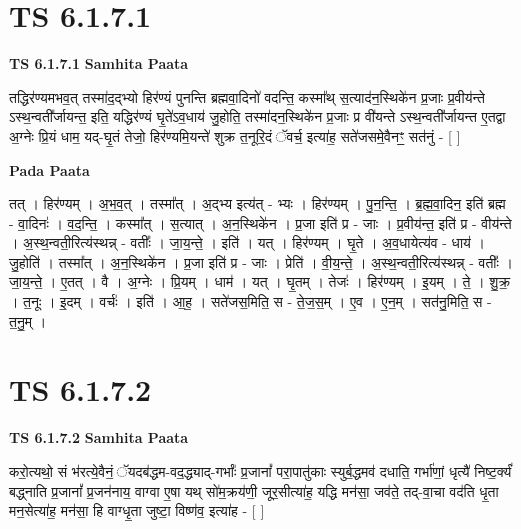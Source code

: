 \documentclass[17pt]{extarticle}
\begin{document}

\section{ TS 6.1.7.1 }

\textbf{TS 6.1.7.1 } \newline
\textbf{Samhita Paata} \newline

तद्धिर॑ण्यमभव॒त् तस्मा॑द॒द्भ्यो हिर॑ण्यं पुनन्ति ब्रह्मवा॒दिनो॑ वदन्ति॒ कस्मा᳚थ् स॒त्याद॑न॒स्थिके॑न प्र॒जाः प्र॒वीय॑न्ते ऽस्थ॒न्वती᳚र्जायन्त॒ इति॒ यद्धिर॑ण्यं घृ॒ते॑ऽव॒धाय॑ जु॒होति॒ तस्मा॑दन॒स्थिके॑न प्र॒जाः प्र वी॑यन्ते ऽस्थ॒न्वती᳚र्जायन्त ए॒तद्वा अ॒ग्नेः प्रि॒यं धाम॒ यद्-घृ॒तं तेजो॒ हिर॑ण्यमि॒यन्ते॑ शुक्र त॒नूरि॒दं ॅवर्च॒ इत्या॑ह॒ सते॑जसमे॒वैनꣳ॒॒ सत॑नुं - [  ] \newline

\textbf{Pada Paata} \newline

तत् । हिर॑ण्यम् । अ॒भ॒व॒त् । तस्मा᳚त् । अ॒द्भ्य इत्य॑त् - भ्यः । हिर॑ण्यम् । पु॒न॒न्ति॒ । ब्र॒ह्म॒वा॒दिन॒ इति॑ ब्रह्म - वा॒दिनः॑ । व॒द॒न्ति॒ । कस्मा᳚त् । स॒त्यात् । अ॒न॒स्थिके॑न । प्र॒जा इति॑ प्र - जाः । प्र॒वीय॑न्त॒ इति॑ प्र - वीय॑न्ते । अ॒स्थ॒न्वती॒रित्य॑स्थन्न् - वतीः᳚ । जा॒य॒न्ते॒ । इति॑ । यत् । हिर॑ण्यम् । घृ॒ते । अ॒व॒धायेत्य॑व - धाय॑ । जु॒होति॑ । तस्मा᳚त् । अ॒न॒स्थिके॑न । प्र॒जा इति॑ प्र - जाः । प्रेति॑ । वी॒य॒न्ते॒ । अ॒स्थ॒न्वती॒रित्य॑स्थन्न् - वतीः᳚ । जा॒य॒न्ते॒ । ए॒तत् । वै । अ॒ग्नेः । प्रि॒यम् । धाम॑ । यत् । घृ॒तम् । तेजः॑ । हिर॑ण्यम् । इ॒यम् । ते॒ । शु॒क्र॒ । त॒नूः । इ॒दम् । वर्चः॑ । इति॑ । आ॒ह॒ । सते॑जस॒मिति॒ स - ते॒ज॒स॒म् । ए॒व । ए॒न॒म् । सत॑नु॒मिति॒ स - त॒नु॒म् ।  \newline





\section{ TS 6.1.7.2 }

\textbf{TS 6.1.7.2 } \newline
\textbf{Samhita Paata} \newline

करो॒त्यथो॒ सं भ॑रत्ये॒वैनं॒ ॅयदब॑द्धम-वद॒द्ध्याद्-गर्भाः᳚ प्र॒जानां᳚ परा॒पातु॑काः स्युर्ब॒द्धमव॑ दधाति॒ गर्भा॑णां॒ धृत्यै॑ निष्ट॒र्क्यं॑ बद्ध्नाति प्र॒जानां᳚ प्र॒जन॑नाय॒ वाग्वा ए॒षा यथ् सो॑म॒क्रय॑णी॒ जूर॒सीत्या॑ह॒ यद्धि मन॑सा॒ जव॑ते॒ तद्-वा॒चा वद॑ति धृ॒ता मन॒सेत्या॑ह॒ मन॑सा॒ हि वाग्धृ॒ता जुष्टा॒ विष्ण॑व॒ इत्या॑ह - [  ] \newline
\end{document}
